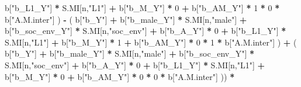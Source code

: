 \documentclass[
]{book}
\newenvironment{Shaded}{\begin{snugshade}}{\end{snugshade}}
\newcommand{\DecValTok}[1]{\textcolor[rgb]{0.00,0.00,0.81}{#1}}
\newcommand{\NormalTok}[1]{#1}
\newcommand{\SpecialCharTok}[1]{\textcolor[rgb]{0.81,0.36,0.00}{\textbf{#1}}}
\newcommand{\StringTok}[1]{\textcolor[rgb]{0.31,0.60,0.02}{#1}}
\begin{document}
\begin{Shaded}
\begin{Highlighting}[]
\NormalTok{                                b[}\StringTok{"b\_L1\_Y"}\NormalTok{] }\SpecialCharTok{*}\NormalTok{ S.MI[n,}\StringTok{"L1"}\NormalTok{] }\SpecialCharTok{+}
\NormalTok{                                b[}\StringTok{"b\_M\_Y"}\NormalTok{] }\SpecialCharTok{*} \DecValTok{0} \SpecialCharTok{+}
\NormalTok{                                b[}\StringTok{"b\_AM\_Y"}\NormalTok{] }\SpecialCharTok{*} \DecValTok{1} \SpecialCharTok{*} \DecValTok{0} \SpecialCharTok{*}\NormalTok{ b[}\StringTok{"A.M.inter"}\NormalTok{] ) }\SpecialCharTok{{-}} 
\NormalTok{                            ( b[}\StringTok{"b\_Y"}\NormalTok{] }\SpecialCharTok{+} 
\NormalTok{                                b[}\StringTok{"b\_male\_Y"}\NormalTok{] }\SpecialCharTok{*}\NormalTok{ S.MI[n,}\StringTok{"male"}\NormalTok{] }\SpecialCharTok{+} 
\NormalTok{                                b[}\StringTok{"b\_soc\_env\_Y"}\NormalTok{] }\SpecialCharTok{*}\NormalTok{ S.MI[n,}\StringTok{"soc\_env"}\NormalTok{] }\SpecialCharTok{+} 
\NormalTok{                                b[}\StringTok{"b\_A\_Y"}\NormalTok{] }\SpecialCharTok{*} \DecValTok{0} \SpecialCharTok{+} 
\NormalTok{                                b[}\StringTok{"b\_L1\_Y"}\NormalTok{] }\SpecialCharTok{*}\NormalTok{ S.MI[n,}\StringTok{"L1"}\NormalTok{] }\SpecialCharTok{+}
\NormalTok{                                b[}\StringTok{"b\_M\_Y"}\NormalTok{] }\SpecialCharTok{*} \DecValTok{1} \SpecialCharTok{+}
\NormalTok{                                b[}\StringTok{"b\_AM\_Y"}\NormalTok{] }\SpecialCharTok{*} \DecValTok{0} \SpecialCharTok{*} \DecValTok{1} \SpecialCharTok{*}\NormalTok{ b[}\StringTok{"A.M.inter"}\NormalTok{] ) }\SpecialCharTok{+} 
\NormalTok{                            ( b[}\StringTok{"b\_Y"}\NormalTok{] }\SpecialCharTok{+} 
\NormalTok{                                b[}\StringTok{"b\_male\_Y"}\NormalTok{] }\SpecialCharTok{*}\NormalTok{ S.MI[n,}\StringTok{"male"}\NormalTok{] }\SpecialCharTok{+} 
\NormalTok{                                b[}\StringTok{"b\_soc\_env\_Y"}\NormalTok{] }\SpecialCharTok{*}\NormalTok{ S.MI[n,}\StringTok{"soc\_env"}\NormalTok{] }\SpecialCharTok{+} 
\NormalTok{                                b[}\StringTok{"b\_A\_Y"}\NormalTok{] }\SpecialCharTok{*} \DecValTok{0} \SpecialCharTok{+} 
\NormalTok{                                b[}\StringTok{"b\_L1\_Y"}\NormalTok{] }\SpecialCharTok{*}\NormalTok{ S.MI[n,}\StringTok{"L1"}\NormalTok{] }\SpecialCharTok{+}
\NormalTok{                                b[}\StringTok{"b\_M\_Y"}\NormalTok{] }\SpecialCharTok{*} \DecValTok{0} \SpecialCharTok{+}
\NormalTok{                                b[}\StringTok{"b\_AM\_Y"}\NormalTok{] }\SpecialCharTok{*} \DecValTok{0} \SpecialCharTok{*} \DecValTok{0} \SpecialCharTok{*}\NormalTok{ b[}\StringTok{"A.M.inter"}\NormalTok{] )) }\SpecialCharTok{*}

\end{Highlighting}
\end{Shaded}
\end{document}
